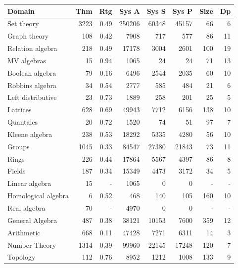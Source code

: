 \documentclass[runningheads]{llncs}
\begin{document}
\begin{table}[tb]
\begin{center}
\setlength{\tabcolsep}{4pt}
\begin{tabular}{l|rr|rrrrr}
Domain              & Thm  & Rtg  &  Sys A & Sys S & Sys P & Size & Dp \\
\hline
Set theory          & 3223 & 0.49 & 250206 & 60348 & 45157 &   66 &     6 \\
Graph theory        &  108 & 0.42 &   7908 &   717 &   577 &   86 &    11 \\
Relation algebra    &  218 & 0.49 &  17178 &  3004 &  2601 &  100 &    19 \\
MV algebras         &   15 & 0.94 &   1065 &    24 &    24 &   71 &    13 \\
Boolean algebra     &   79 & 0.16 &   6496 &  2544 &  2035 &   60 &    10 \\
Robbins algebra     &   34 & 0.54 &   2777 &   585 &   484 &   21 &     6 \\
Left distributive   &   23 & 0.73 &   1889 &   258 &   201 &   25 &     5 \\
Lattices            &  628 & 0.69 &  49943 &  7712 &  6156 &  138 &    10 \\
Quantales           &   20 & 0.72 &   1520 &    74 &    51 &   97 &     7 \\
Kleene algebra      &  238 & 0.53 &  18292 &  5335 &  4280 &   56 &    10 \\
Groups              & 1045 & 0.33 &  84547 & 27380 & 21843 &   73 &    11 \\
Rings               &  226 & 0.44 &  17864 &  5567 &  4397 &   86 &     8 \\
Fields              &  187 & 0.34 &  15349 &  4473 &  3172 &   34 &     5 \\
Linear algebra      &   15 & -    &   1065 &     0 &     0 &    - &     - \\
Homological algebra &    6 & 0.52 &    468 &   140 &   105 &  160 &    10 \\
Real algebra        &   70 & -    &   4970 &     0 &     0 &    - &     - \\
General Algebra     &  487 & 0.38 &  38121 & 10153 &  7600 &  359 &    12 \\
Arithmetic          &  668 & 0.11 &  47428 &  7271 &  6311 &   14 &     3 \\
Number Theory       & 1314 & 0.39 &  99960 & 22145 & 17248 &  120 &     7 \\
Topology            &  112 & 0.76 &   8952 &  1212 &  1008 &  133 &     9 \\

\end{tabular}
\end{center}
\end{table}
\end{document}
